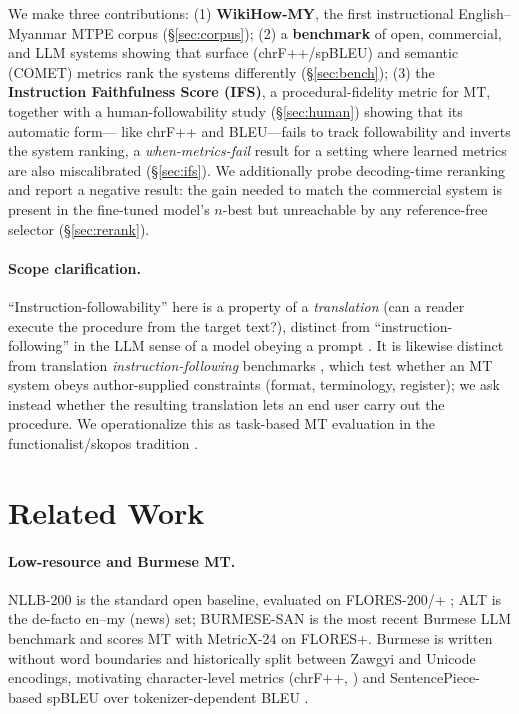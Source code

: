 \documentclass[11pt]{article}
\begin{document}
We make three contributions:
(1) \textbf{WikiHow-MY}, the first instructional English--Myanmar MTPE corpus
(\S\ref{sec:corpus});
(2) a \textbf{benchmark} of open, commercial, and LLM systems showing that surface
(chrF++/spBLEU) and semantic (COMET) metrics rank the systems differently (\S\ref{sec:bench});
(3) the \textbf{Instruction Faithfulness Score (IFS)}, a procedural-fidelity metric for MT,
together with a human-followability study (\S\ref{sec:human}) showing that its automatic form---
like chrF++ and BLEU---fails to track followability and inverts the system ranking, a
\emph{when-metrics-fail} result for a setting where learned metrics are also miscalibrated
\citep{falcao2024comet,africomet2024} (\S\ref{sec:ifs}).
We additionally probe decoding-time reranking and report a negative result: the gain
needed to match the commercial system is present in the fine-tuned model's $n$-best but
unreachable by any reference-free selector (\S\ref{sec:rerank}).

\paragraph{Scope clarification.} ``Instruction-followability'' here is a property of a
\emph{translation} (can a reader execute the procedure from the target text?), distinct
from ``instruction-following'' in the LLM sense of a model obeying a prompt
\citep{ifeval2023,xifbench2025}. It is likewise distinct from translation
\emph{instruction-following} benchmarks \citep{ifmtbench2026}, which test whether an MT system
obeys author-supplied constraints (format, terminology, register); we ask instead whether the
resulting translation lets an end user carry out the procedure. We operationalize this as
task-based MT evaluation \citep{gale_taskbased} in the functionalist/skopos tradition
\citep{reissvermeer1984}.

\section{Related Work}
\paragraph{Low-resource and Burmese MT.} NLLB-200 \citep{nllb2024} is the standard open
baseline, evaluated on FLORES-200/+ \citep{flores200,floresplus2024}; ALT \citep{alt2016}
is the de-facto en--my (news) set; BURMESE-SAN \citep{burmesesan2026} is the most recent
Burmese LLM benchmark and scores MT with MetricX-24 \citep{metricx2024} on FLORES+.
Burmese is written without word boundaries and historically split between Zawgyi and
Unicode encodings, motivating character-level metrics (chrF++, \citealp{chrfpp2017}) and
SentencePiece-based spBLEU \citep{flores101spbleu2022} over tokenizer-dependent BLEU
\citep{bleu2002}.
\end{document}
